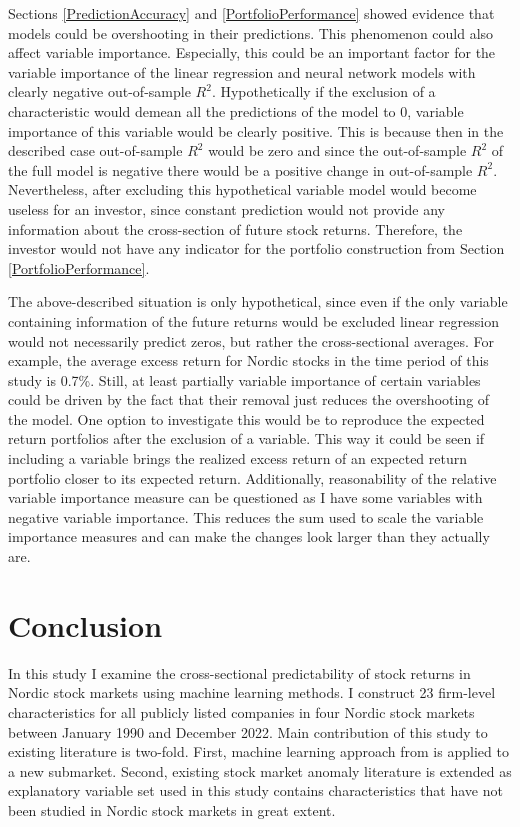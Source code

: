 \documentclass[12pt]{article}
\begin{document}
Sections \ref{PredictionAccuracy} and \ref{PortfolioPerformance} showed evidence that models could be overshooting in their predictions. This phenomenon could also affect variable importance. Especially, this could be an important factor for the variable importance of the linear regression and neural network models with clearly negative out-of-sample $R^2$. Hypothetically if the exclusion of a characteristic would demean all the predictions of the model to 0, variable importance of this variable would be clearly positive. This is because then in the described case out-of-sample $R^2$ would be zero and since the out-of-sample $R^2$ of the full model is negative there would be a positive change in out-of-sample $R^2$. Nevertheless, after excluding this hypothetical variable model would become useless for an investor, since constant prediction would not provide any information about the cross-section of future stock returns. Therefore, the investor would not have any indicator for the portfolio construction from Section \ref{PortfolioPerformance}. \par

The above-described situation is only hypothetical, since even if the only variable containing information of the future returns would be excluded linear regression would not necessarily predict zeros, but rather the cross-sectional averages. For example, the average excess return for Nordic stocks in the time period of this study is 0.7\%. Still, at least partially variable importance of certain variables could be driven by the fact that their removal just reduces the overshooting of the model. One option to investigate this would be to reproduce the expected return portfolios after the exclusion of a variable. This way it could be seen if including a variable brings the realized excess return of an expected return portfolio closer to its expected return. Additionally, reasonability of the relative variable importance measure can be questioned as I have some variables with negative variable importance. This reduces the sum used to scale the variable importance measures and can make the changes look larger than they actually are. \par

\section{Conclusion}\label{Conclusion}

In this study I examine the cross-sectional predictability of stock returns in Nordic stock markets using machine learning methods. I construct 23 firm-level characteristics for all publicly listed companies in four Nordic stock markets between January 1990 and December 2022. Main contribution of this study to existing literature is two-fold. First, machine learning approach from \citet{guetal} is applied to a new submarket.\footnotemark {} Second, existing stock market anomaly literature is extended as explanatory variable set used in this study contains characteristics that have not been studied in Nordic stock markets in great extent. \par
\end{document}
